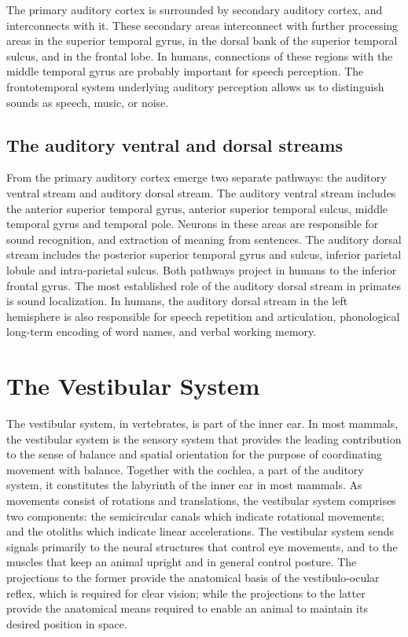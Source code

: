 \documentclass[]{book}
\begin{document}
The primary auditory cortex is surrounded by secondary auditory cortex, and interconnects with it. These secondary areas interconnect with further processing areas in the superior temporal gyrus, in the dorsal bank of the superior temporal sulcus, and in the frontal lobe. In humans, connections of these regions with the middle temporal gyrus are probably important for speech perception. The frontotemporal system underlying auditory perception allows us to distinguish sounds as speech, music, or noise.

\hypertarget{the-auditory-ventral-and-dorsal-streams}{%
\subsection{The auditory ventral and dorsal streams}\label{the-auditory-ventral-and-dorsal-streams}}

From the primary auditory cortex emerge two separate pathways: the auditory ventral stream and auditory dorsal stream. The auditory ventral stream includes the anterior superior temporal gyrus, anterior superior temporal sulcus, middle temporal gyrus and temporal pole. Neurons in these areas are responsible for sound recognition, and extraction of meaning from sentences. The auditory dorsal stream includes the posterior superior temporal gyrus and sulcus, inferior parietal lobule and intra-parietal sulcus. Both pathways project in humans to the inferior frontal gyrus. The most established role of the auditory dorsal stream in primates is sound localization. In humans, the auditory dorsal stream in the left hemisphere is also responsible for speech repetition and articulation, phonological long-term encoding of word names, and verbal working memory.

\hypertarget{the-vestibular-system}{%
\section{The Vestibular System}\label{the-vestibular-system}}

The vestibular system, in vertebrates, is part of the inner ear. In most mammals, the vestibular system is the sensory system that provides the leading contribution to the sense of balance and spatial orientation for the purpose of coordinating movement with balance. Together with the cochlea, a part of the auditory system, it constitutes the labyrinth of the inner ear in most mammals. As movements consist of rotations and translations, the vestibular system comprises two components: the semicircular canals which indicate rotational movements; and the otoliths which indicate linear accelerations. The vestibular system sends signals primarily to the neural structures that control eye movements, and to the muscles that keep an animal upright and in general control posture. The projections to the former provide the anatomical basis of the vestibulo-ocular reflex, which is required for clear vision; while the projections to the latter provide the anatomical means required to enable an animal to maintain its desired position in space.
\end{document}
